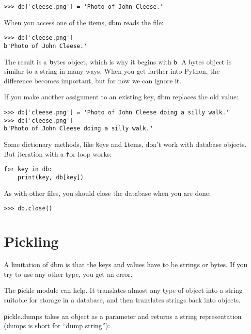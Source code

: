 \documentclass[
DIV=11,
fontsize=13,
twoside,
headinclude=false,
titlepage=firstiscover,
abstract=true,
headsepline=true,
footsepline=true,
chapterprefix=true, %
headings=big,
bibliography=totoc,%
captions=tableheading
]{scrbook}
\theoremstyle{definition}
\begin{document}
\begin{lstlisting}
>>> db['cleese.png'] = 'Photo of John Cleese.'
\end{lstlisting}
%
When you access one of the items, {\texttt dbm} reads the file:

\begin{lstlisting}
>>> db['cleese.png']
b'Photo of John Cleese.'
\end{lstlisting}
%
The result is a {\textbf bytes object}, which is why it begins with {\texttt
  b}.  A bytes object is similar to a string in many ways.  When you
get farther into Python, the difference becomes important, but for now
we can ignore it.

If you make another assignment to an existing key, {\texttt dbm} replaces
the old value:

\begin{lstlisting}
>>> db['cleese.png'] = 'Photo of John Cleese doing a silly walk.'
>>> db['cleese.png']
b'Photo of John Cleese doing a silly walk.'
\end{lstlisting}
%

Some dictionary methods, like {\texttt keys} and {\texttt items}, don't
work with database objects.  But iteration with a {\texttt for}
loop works:

\begin{lstlisting}
for key in db:
    print(key, db[key])
\end{lstlisting}
%
As with other files, you should close the database when you are
done:

\begin{lstlisting}
>>> db.close()
\end{lstlisting}
%


\section{Pickling}

A limitation of {\texttt dbm} is that the keys and values have to be
strings or bytes.  If you try to use any other type, you get an error.
 

The {\texttt pickle} module can help.  It translates
almost any type of object into a string suitable for storage in a
database, and then translates strings back into objects.

{\texttt pickle.dumps} takes an object as a parameter and returns
a string representation ({\texttt dumps} is short for ``dump string''):
\end{document}
